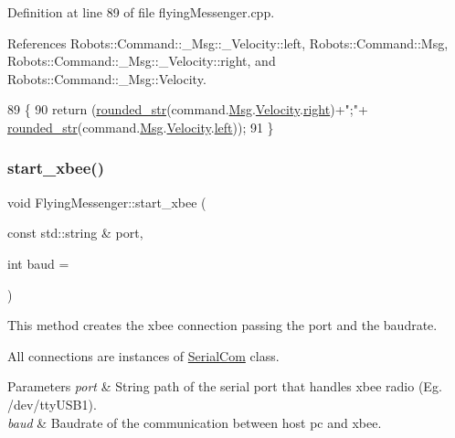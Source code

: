 Definition at line 89 of file flying\+Messenger.\+cpp.



References Robots\+::\+Command\+::\+\_\+\+Msg\+::\+\_\+\+Velocity\+::left, Robots\+::\+Command\+::\+Msg, Robots\+::\+Command\+::\+\_\+\+Msg\+::\+\_\+\+Velocity\+::right, and Robots\+::\+Command\+::\+\_\+\+Msg\+::\+Velocity.


\begin{DoxyCode}
89                                                           \{
90     \textcolor{keywordflow}{return} (\hyperlink{class_flying_messenger_a687ff0844f83088397544fb7e9aab7cb}{rounded\_str}(command.\hyperlink{struct_robots_1_1_command_a598cda1f7d4b2879d8a1435ceebbc0db}{Msg}.\hyperlink{struct_robots_1_1_command_1_1___msg_a539fff26601e0902fcf867eab3e08d79}{Velocity}.\hyperlink{struct_robots_1_1_command_1_1___msg_1_1___velocity_a2822c89acc2f922ebcae5bc18b76f95a}{right})+\textcolor{stringliteral}{";"}+ 
      \hyperlink{class_flying_messenger_a687ff0844f83088397544fb7e9aab7cb}{rounded\_str}(command.\hyperlink{struct_robots_1_1_command_a598cda1f7d4b2879d8a1435ceebbc0db}{Msg}.\hyperlink{struct_robots_1_1_command_1_1___msg_a539fff26601e0902fcf867eab3e08d79}{Velocity}.\hyperlink{struct_robots_1_1_command_1_1___msg_1_1___velocity_a232f831a43dd42cb03227b433961ca3f}{left}));
91 \}
\end{DoxyCode}
\mbox{\label{class_flying_messenger_ae0513090a7933976d04ce67f4d90b1f3}} 
\subsubsection{\texorpdfstring{start\+\_\+xbee()}{start\_xbee()}}
{\footnotesize\ttfamily void Flying\+Messenger\+::start\+\_\+xbee (\begin{DoxyParamCaption}\item[{const std\+::string \&}]{port,  }\item[{int}]{baud = {} }\end{DoxyParamCaption})}



This method creates the xbee connection passing the port and the baudrate. 

All connections are instances of \hyperlink{class_serial_com}{Serial\+Com} class. 
\begin{DoxyParams}{Parameters}
{\em port} & String path of the serial port that handles xbee radio (Eg. /dev/tty\+U\+S\+B1). \\
\hline
{\em baud} & Baudrate of the communication between host pc and xbee. \\
\hline
\end{DoxyParams}


